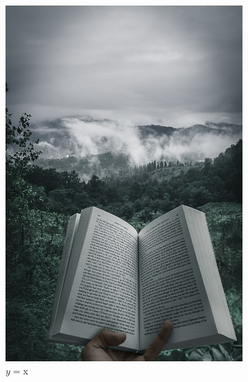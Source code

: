 \begin{figure}[!t]
    \centering
    \begin{subfigure}[b]{0.3\textwidth}
        \centering
        \includegraphics[width=\textwidth]{images/f}
        \caption{$y=$x}
        \label{fig:wave1}
    \end{subfigure}
    \hfill
    \begin{subfigure}[b]{0.3\textwidth}
        \centering

\end{subfigure}
\end{figure}
